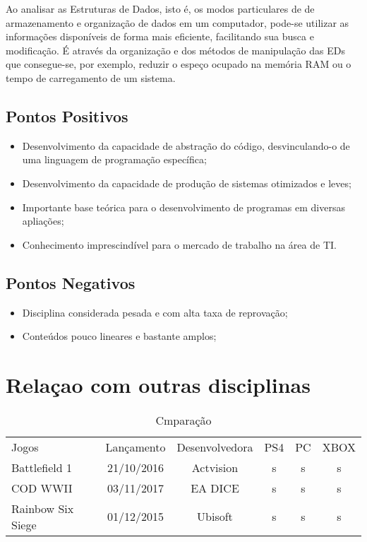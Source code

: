 \documentclass[a4paper]{article}
\begin{document}
Ao analisar as Estruturas de Dados, isto é, os modos particulares de de armazenamento e organização de dados em um computador, pode-se utilizar as informações disponíveis de forma mais eficiente, facilitando sua busca e modificação. É através da organização e dos métodos de manipulação das EDs que consegue-se, por exemplo, reduzir o espeço ocupado na memória RAM ou o tempo de carregamento de um sistema.

\subsection{Pontos Positivos}
\begin{itemize}
	\item Desenvolvimento da capacidade de abstração do código, desvinculando-o de uma linguagem de programação específica;
	\item Desenvolvimento da capacidade de produção de sistemas otimizados e leves;
    \item Importante base teórica para o desenvolvimento de programas em diversas apliações;
    \item Conhecimento imprescindível para o mercado de trabalho na área de TI.
\end{itemize}

\subsection{Pontos Negativos}
\begin{itemize}
	\item Disciplina considerada pesada e com alta taxa de reprovação;
    \item Conteúdos pouco lineares e bastante amplos;
\end{itemize}

\section{Relaçao com outras disciplinas}

\begin{table}[h]
\centering
\caption{Cmparação}
\label{table:comparacao}
\begin{tabular}{lccccc}
Jogos                             & \multicolumn{1}{l}{Lançamento} & \multicolumn{1}{l}{Desenvolvedora} & \multicolumn{1}{l}{PS4} & \multicolumn{1}{l}{PC} & \multicolumn{1}{l}{XBOX} \\
\multicolumn{1}{l}{Battlefield 1} & 21/10/2016                     & Actvision                          & s                       & s                      & s                        \\
\multicolumn{1}{l}{COD WWII}      & 03/11/2017                     & EA DICE                            & s                       & s                      & s                        \\
Rainbow Six Siege                 & 01/12/2015                     & Ubisoft                            & s                       & s                      & s                       
\end{tabular}
\end{table}



\end{document}
